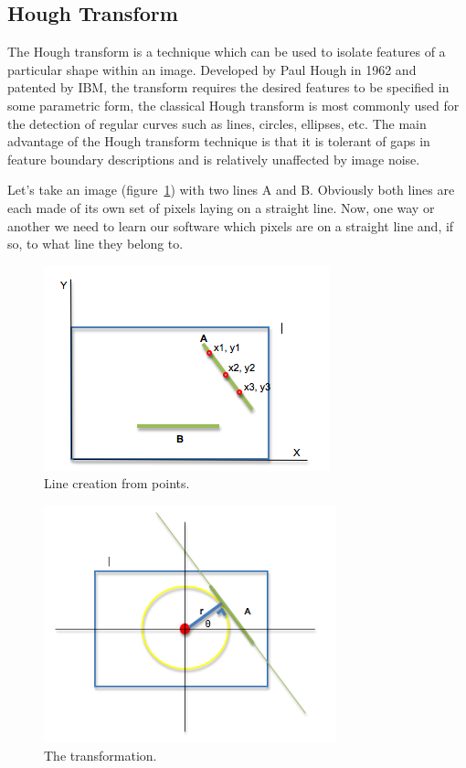 \subsection{Hough Transform}

The Hough transform is a technique which can be used to isolate features of a particular shape within an image. Developed by Paul Hough in 1962 and patented by IBM, the transform requires the desired features to be specified in some parametric form, the classical Hough transform is most commonly used for the detection of regular curves such as lines, circles, ellipses, etc. The main advantage of the Hough transform technique is that it is tolerant of gaps in feature boundary descriptions and is relatively unaffected by image noise.

Let's take an image (figure~\ref{fig:lane5}) with two lines A and B. Obviously both lines are each made of its own set of pixels laying on a straight line. Now, one way or another we need to learn our software which pixels are on a straight line and, if so, to what line they belong to.

\begin{figure}[H]
\begin{center}
    \includegraphics[scale=0.6]{img/lane5.png}
\end{center}
\caption{Line creation from points.}
\label{fig:lane5}
\end{figure}

\begin{figure}[H]
\begin{center}
    \includegraphics[scale=0.6]{img/lane6.png}
\end{center}
\caption{The transformation.}
\label{fig:lane6}
\end{figure}

